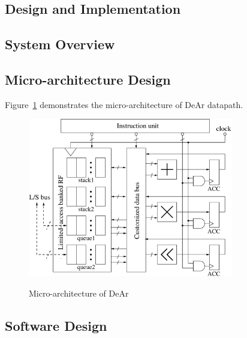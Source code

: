 \documentclass[12pt]{article}
\begin{document}
\begin{CJK}{UTF8}{bkai}
\section{Design and Implementation}
    \subsection{System Overview}
    \subsection{Micro-architecture Design}
        Figure~\ref{fig:micro} demonstrates the micro-architecture of DeAr datapath.
        \begin{figure}[!ht] 
            \caption{Micro-architecture of DeAr}
            \centering
            \includegraphics[width=0.8\textwidth]{./figs/micro.eps}
            \label{fig:micro}
        \end{figure}
    \subsection{Software Design}

\end{CJK}
\end{document}
